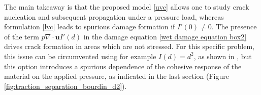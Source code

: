 The main takeaway is that the proposed model \eqref{uvc} allows one to study crack nucleation and subsequent propagation under a pressure load, whereas formulation \eqref{lvc} leads to spurious damage formation if $I'(0) \neq 0$. The presence of the term $p\nabla \cdot \textbf{u}I'(d)$ in the damage equation \eqref{wet damage equation box2} drives crack formation in areas which are not stressed. For this specific problem, this issue can be circumvented using for example $I(d) = d^2$, as shown in \cite{jiang2022phase}, but this option introduces a spurious dependence of the cohesive response of the material on the applied pressure, as indicated in the last section (Figure \ref{fig:traction_separation_bourdin_d2}).





